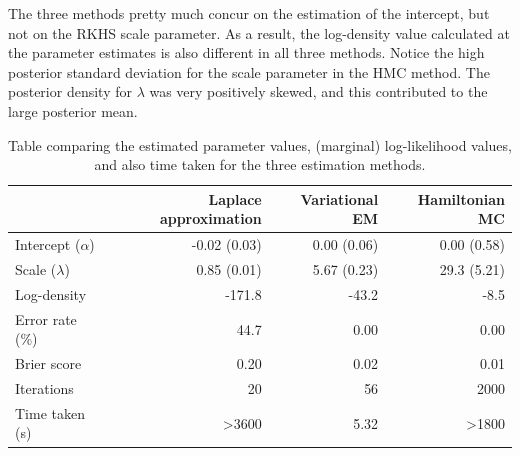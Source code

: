 The three methods pretty much concur on the estimation of the intercept, but not on the RKHS scale parameter.
As a result, the log-density value calculated at the parameter estimates is also different in all three methods.
Notice the high posterior standard deviation for the scale parameter in the HMC method.
The posterior density for $\lambda$ was very positively skewed, and this contributed to the large posterior mean.

\begin{table}[hbt]
\centering
\caption{Table comparing the estimated parameter values, (marginal) log-likelihood values, and also time taken for the three estimation methods.}
\label{tab:compreiprobit}
\begin{tabular}{@{}lrrr@{}}
\toprule
& Laplace approximation 
& Variational EM 
& Hamiltonian MC          \\ \midrule
Intercept ($\alpha$)      & -0.02 (0.03)           & 0.00 (0.06)    & 0.00 (0.58)  \\
Scale ($\lambda$)      & 0.85 (0.01)         & 5.67 (0.23)  & 29.3 (5.21)     \\[0.5em]
Log-density    & -171.8              & -43.2       & -8.5                  \\
Error rate (\%) & 44.7               & 0.00        & 0.00                   \\
Brier score & 0.20               & 0.02        & 0.01                   \\[0.5em]
Iterations     & 20                  & 56          & 2000                    \\
Time taken (s) & >3600                & 5.32         & >1800                     \\ \bottomrule
\end{tabular}
\end{table}


